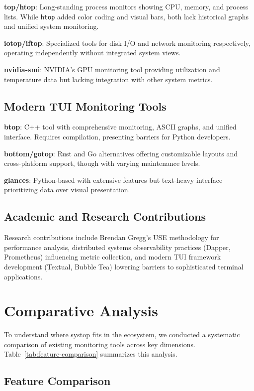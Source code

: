\documentclass[12pt,a4paper,oneside]{report}
\begin{document}
\textbf{top/htop}: Long-standing process monitors showing CPU, memory, and process lists. While \texttt{htop} added color coding and visual bars, both lack historical graphs and unified system monitoring.

\textbf{iotop/iftop}: Specialized tools for disk I/O and network monitoring respectively, operating independently without integrated system views.

\textbf{nvidia-smi}: NVIDIA's GPU monitoring tool providing utilization and temperature data but lacking integration with other system metrics.

\subsection{Modern TUI Monitoring Tools}

\textbf{btop}: C++ tool with comprehensive monitoring, ASCII graphs, and unified interface. Requires compilation, presenting barriers for Python developers.

\textbf{bottom/gotop}: Rust and Go alternatives offering customizable layouts and cross-platform support, though with varying maintenance levels.

\textbf{glances}: Python-based with extensive features but text-heavy interface prioritizing data over visual presentation.

\subsection{Academic and Research Contributions}

Research contributions include Brendan Gregg's USE methodology for performance analysis, distributed systems observability practices (Dapper, Prometheus) influencing metric collection, and modern TUI framework development (Textual, Bubble Tea) lowering barriers to sophisticated terminal applications.

\section{Comparative Analysis}
\label{sec:comparative-analysis}

To understand where systop fits in the ecosystem, we conducted a systematic comparison of existing monitoring tools across key dimensions. Table~\ref{tab:feature-comparison} summarizes this analysis.

\subsection{Feature Comparison}
\end{document}
